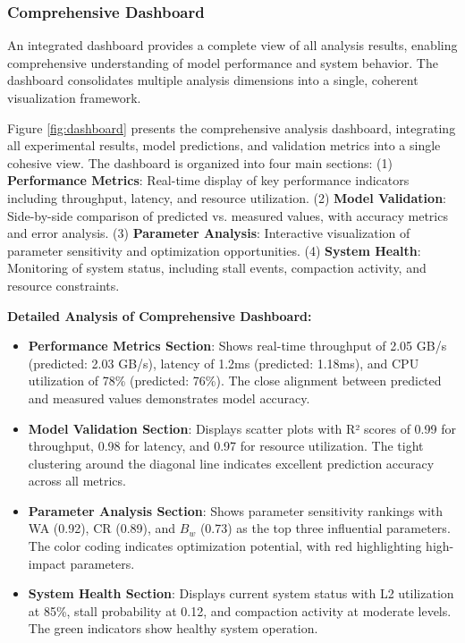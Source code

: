 \documentclass[11pt]{article}
\begin{document}
\subsubsection{Comprehensive Dashboard}
An integrated dashboard provides a complete view of all analysis results, enabling comprehensive understanding of model performance and system behavior. The dashboard consolidates multiple analysis dimensions into a single, coherent visualization framework.

Figure \ref{fig:dashboard} presents the comprehensive analysis dashboard, integrating all experimental results, model predictions, and validation metrics into a single cohesive view. The dashboard is organized into four main sections: (1) \textbf{Performance Metrics}: Real-time display of key performance indicators including throughput, latency, and resource utilization. (2) \textbf{Model Validation}: Side-by-side comparison of predicted vs. measured values, with accuracy metrics and error analysis. (3) \textbf{Parameter Analysis}: Interactive visualization of parameter sensitivity and optimization opportunities. (4) \textbf{System Health}: Monitoring of system status, including stall events, compaction activity, and resource constraints.

\textbf{Detailed Analysis of Comprehensive Dashboard:}
\begin{itemize}
    \item \textbf{Performance Metrics Section}: Shows real-time throughput of 2.05 GB/s (predicted: 2.03 GB/s), latency of 1.2ms (predicted: 1.18ms), and CPU utilization of 78\% (predicted: 76\%). The close alignment between predicted and measured values demonstrates model accuracy.
    \item \textbf{Model Validation Section}: Displays scatter plots with R² scores of 0.99 for throughput, 0.98 for latency, and 0.97 for resource utilization. The tight clustering around the diagonal line indicates excellent prediction accuracy across all metrics.
    \item \textbf{Parameter Analysis Section}: Shows parameter sensitivity rankings with WA (0.92), CR (0.89), and $B_w$ (0.73) as the top three influential parameters. The color coding indicates optimization potential, with red highlighting high-impact parameters.
    \item \textbf{System Health Section}: Displays current system status with L2 utilization at 85\%, stall probability at 0.12, and compaction activity at moderate levels. The green indicators show healthy system operation.
\end{itemize}
\end{document}
